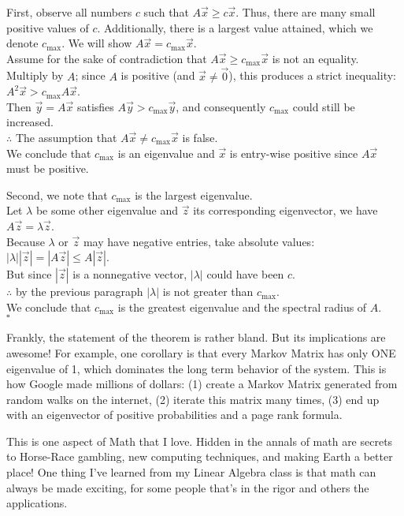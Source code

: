 \documentclass[12pt]{article}
\newcommand{\z}{\vec{0}}
\begin{document}
	\quad First, observe all numbers $c$ such that $A\vec{x} \ge c\vec{x}$. Thus, there are many small positive values of $c$. Additionally, there is a largest value attained, which we denote $c_{\text{max}}$. We will show $A\vec{x} = c_{\text{max}}\vec{x}$. \\
	Assume for the sake of contradiction that $A\vec{x} \ge c_{\text{max}}\vec{x}$ is not an equality. \\
	Multiply by $A$; since $A$ is positive (and $\vec{x} \ne \z$), this produces a strict inequality: $A^2\vec{x} > c_{\text{max}}A\vec{x}$. \\
	 Then $\vec{y} = A\vec{x}$ satisfies $A\vec{y} > c_{\text{max}}\vec{y}$, and consequently $c_{\text{max}}$ could still be increased. \\
	 $\therefore$ The assumption that $A\vec{x} \ne c_{\text{max}}\vec{x}$ is false. \\ 
	 We conclude that $c_{\text{max}}$ is an eigenvalue and $\vec{x}$ is entry-wise positive since $A\vec{x}$ must be positive. 
	
	\quad Second, we note that $c_{\text{max}}$ is the largest eigenvalue.  \\
	Let $\lambda$ be some other eigenvalue and $\vec{z}$ its corresponding eigenvector, we have $A\vec{z} = \lambda\vec{z}$. \\
	Because $\lambda$ or $\vec{z}$ may have negative entries, take absolute values: $|\lambda| | \vec{z} | = |A\vec{z}| \le A|\vec{z}|$. \\
	But since $|\vec{z}|$ is a nonnegative vector, $|\lambda|$ could have been $c$. \\
	$\therefore$ by the previous paragraph $|\lambda|$ is not greater than $c_{\text{max}}$. \\
	We conclude that $c_{\text{max}}$ is the greatest eigenvalue and the spectral radius of $A$. 
	\\
	\null \hfill $\square$
	
	\dotfill
	
	\quad Frankly, the statement of the theorem is rather bland. But its implications are awesome! For example, one corollary is that every Markov Matrix has only ONE eigenvalue of 1, which dominates the long term behavior of the system. This is how Google made millions of dollars: (1) create a Markov Matrix generated from random walks on the internet, (2) iterate this matrix many times, (3) end up with an eigenvector of positive probabilities and a page rank formula.
	
	\quad This is one aspect of Math that I love. Hidden in the annals of math are secrets to Horse-Race gambling, new computing techniques, and making Earth a better place! One thing I've learned from my Linear Algebra class is that math can always be made exciting, for some people that's in the rigor and others the applications. 
	
\end{document}

